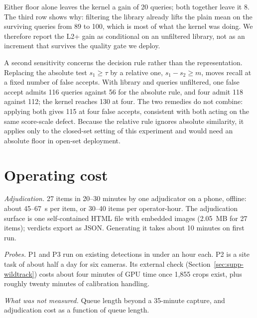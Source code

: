 \documentclass[10pt,a4paper]{article}
\begin{document}
Either floor alone leaves the kernel a gain of 20 queries; both together leave it 8. The third row shows why: filtering the library already lifts the plain mean on the surviving queries from 89 to 100, which is most of what the kernel was doing. We therefore report the L2+ gain as conditional on an unfiltered library, not as an increment that survives the quality gate we deploy.

A second sensitivity concerns the decision rule rather than the representation. Replacing the absolute test $s_1\ge\tau$ by a relative one, $s_1-s_2\ge m$, moves recall at a fixed number of false accepts. With library and queries unfiltered, one false accept admits 116 queries against 56 for the absolute rule, and four admit 118 against 112; the kernel reaches 130 at four. The two remedies do not combine: applying both gives 115 at four false accepts, consistent with both acting on the same score-scale defect. Because the relative rule ignores absolute similarity, it applies only to the closed-set setting of this experiment and would need an absolute floor in open-set deployment.

\section{Operating cost}
\emph{Adjudication.} 27 items in 20--30 minutes by one adjudicator on a phone, offline: about 45--67~s per item, or 30--40 items per operator-hour. The adjudication surface is one self-contained HTML file with embedded images (2.05~MB for 27 items); verdicts export as JSON. Generating it takes about 10 minutes on first run.

\emph{Probes.} P1 and P3 run on existing detections in under an hour each. P2 is a site task of about half a day for six cameras. Its external check (Section~\ref{sec:supp-wildtrack}) costs about four minutes of GPU time once 1{,}855 crops exist, plus roughly twenty minutes of calibration handling.

\emph{What was not measured.} Queue length beyond a 35-minute capture, and adjudication cost as a function of queue length.
\end{document}
